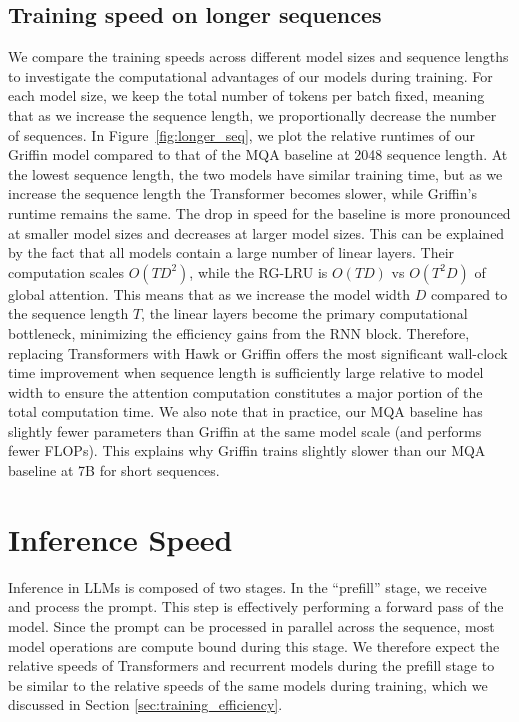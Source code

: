 \subsection{Training speed on longer sequences}

We compare the training speeds across different model sizes and sequence lengths to investigate the computational advantages of our models during training. For each model size, we keep the total number of tokens per batch fixed, meaning that as we increase the sequence length, we proportionally decrease the number of sequences. In Figure~\ref{fig:longer_seq}, we plot the relative runtimes of our Griffin model compared to that of the MQA baseline at 2048 sequence length. At the lowest sequence length, the two models have similar training time, but as we increase the sequence length the Transformer becomes slower, while Griffin's runtime remains the same. The drop in speed for the baseline is more pronounced at smaller model sizes and decreases at larger model sizes. This can be explained by the fact that all models contain a large number of linear layers. Their computation scales $O(T D^2)$, while the RG-LRU  is $O(T D)$ vs $O(T^2 D)$ of global attention. This means that as we increase the model width $D$ compared to the sequence length $T$, the linear layers become the primary computational bottleneck, minimizing the efficiency gains from the RNN {block}. Therefore, replacing Transformers with Hawk or Griffin offers the most significant wall-clock time improvement when sequence length is sufficiently large relative to model width to ensure the attention computation constitutes a major portion of the total computation time. We also note that in practice, our MQA baseline has slightly fewer parameters than Griffin at the same model scale (and performs fewer FLOPs). This explains why Griffin trains slightly slower than our MQA baseline at 7B for short sequences.

\section{Inference Speed}
\label{sec:inference}

Inference in LLMs is composed of two stages. In the ``prefill'' stage, we receive and process the prompt. This step is effectively performing a forward pass of the model. Since the prompt can be processed in parallel across the sequence, most model operations are compute bound during this stage. We therefore expect the relative speeds of Transformers and recurrent models during the prefill stage to be similar to the relative speeds of the same models during training, which we discussed in Section \ref{sec:training_efficiency}. 

